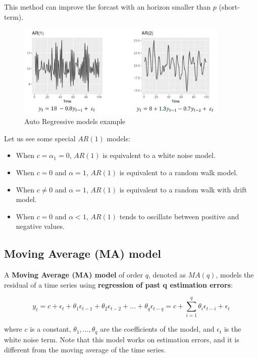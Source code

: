 This method can improve the forcast with an horizon smaller than $p$ (short-term).

\begin{figure}[H]
    \centering
    \includegraphics[width=0.9\textwidth]{figures/ar_model.png}
    \caption{Auto Regressive models example}
    \label{fig:ar_model}
\end{figure}

Let us see some special $AR(1)$ models:
\begin{itemize}
    \item When $c = \alpha_1 = 0$, $AR(1)$ is equivalent to a white noise model.
    \item When $c = 0$ and $\alpha = 1$, $AR(1)$ is equivalent to a random walk model.
    \item When $c \neq 0$ and $\alpha = 1$, $AR(1)$ is equivalent to a random walk with drift model.
    \item When $c = 0$ and $\alpha < 1$, $AR(1)$ tends to oscillate between positive and
    negative values.
\end{itemize}

\subsection{Moving Average (MA) model}

A \textbf{Moving Average (MA) model} of order $q$, denoted as $MA(q)$, models the 
residual of a time series using \textbf{regression of past q estimation errors}:

\begin{equation}
    y_t = c + \epsilon_t + \theta_1 \epsilon_{t-1} + \theta_2 \epsilon_{t-2} + ... + \theta_q \epsilon_{t-q} = c + \sum_{i=1}^q \theta_i \epsilon_{t-i} + \epsilon_t
\end{equation}

where $c$ is a constant, $\theta_1, ..., \theta_q$ are the coefficients of the model,
and $\epsilon_t$ is the white noise term. Note that this model works on estimation errors,
and it is different from the moving average of the time series.

